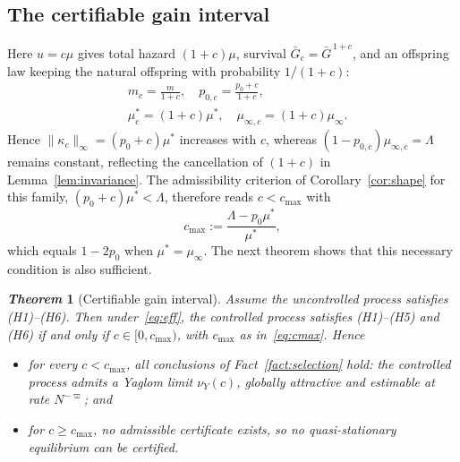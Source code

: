 \documentclass[letterpaper, 10pt, conference]{ieeeconf}
\newtheorem{theorem}{\it \textbf{Theorem}}
\newcommand{\Lbar}{\Lambda}
\newcommand{\rev}[1]{#1}
\newcommand{\ed}[1]{#1}
\begin{document}
\subsection{\rev{The certifiable gain interval}}
\label{sec:gain}
Here $u=c\mu$ gives total hazard $(1+c)\mu$, survival
$\bar G_c=\bar G^{\,1+c}$, and an offspring law keeping the natural offspring
with probability $1/(1+c)$:
\begin{equation}
\begin{aligned}
&m_c=\tfrac{m}{1+c},\quad p_{0,c}=\tfrac{p_0+c}{1+c},\\
&\mu^\ast_c=(1+c)\mu^\ast,\quad \mu_{\infty,c}=(1+c)\mu_\infty .
\end{aligned}
\label{eq:eff}
\end{equation}
Hence
$\|\kappa_c\|_\infty=(p_0+c)\mu^\ast$ increases with $c$, whereas
$(1-p_{0,c})\mu_{\infty,c}=\Lbar$ remains constant, reflecting the cancellation
of $(1+c)$ in Lemma~\ref{lem:invariance}.
\rev{The admissibility criterion of Corollary~\ref{cor:shape} for this family,
$(p_0+c)\mu^\ast<\Lbar$, therefore reads $c<c_{\max}$ with}
\begin{equation}
c_{\max}:=\frac{\Lbar-p_0\mu^\ast}{\mu^\ast},
\label{eq:cmax}
\end{equation}
\rev{which equals $1-2p_0$ when $\mu^\ast=\mu_\infty$. The next theorem shows
that this necessary condition is also sufficient.}
\begin{theorem}[Certifiable gain interval]
\label{thm:cmax}
\ed{Assume the uncontrolled process satisfies (H1)--(H6). Then}
under~\eqref{eq:eff}, the controlled process satisfies (H1)--(H5) and (H6)
if and only if \rev{$c\in[0,c_{\max})$, with $c_{\max}$ as
in~\eqref{eq:cmax}}. Hence
\begin{itemize}
    \item[(a)] for every $c<c_{\max}$, all conclusions of
Fact~\ref{fact:selection} hold: the controlled process admits a Yaglom limit
$\nu_Y(c)$, globally attractive and estimable at rate $N^{-\varpi}$; and
\item[(b)] for $c\ge c_{\max}$, \ed{no admissible certificate exists, so no
quasi-stationary equilibrium can be certified}.
\end{itemize}
\end{theorem}
\end{document}
